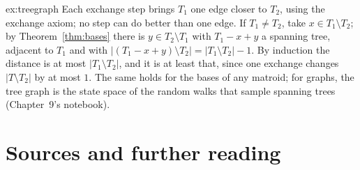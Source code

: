 \begin{solution}{ex:treegraph}
\idea Each exchange step brings $T_1$ one edge closer to $T_2$, using the exchange axiom; no step can do better than one edge.
\writeup If $T_1\ne T_2$, take $x\in T_1\setminus T_2$; by Theorem~\ref{thm:bases} there is $y\in T_2\setminus T_1$ with $T_1-x+y$ a spanning tree, adjacent to $T_1$ and with $|(T_1-x+y)\setminus T_2|=|T_1\setminus T_2|-1$. By induction the distance is at most
$|T_1\setminus T_2|$, and it is at least that, since one exchange changes $|T\setminus T_2|$ by at most $1$. The same holds for the bases of any matroid; for graphs, the tree graph is the state space of the random
walks that sample spanning trees (Chapter~9's notebook).
\end{solution}

\section*{Sources and further reading}

